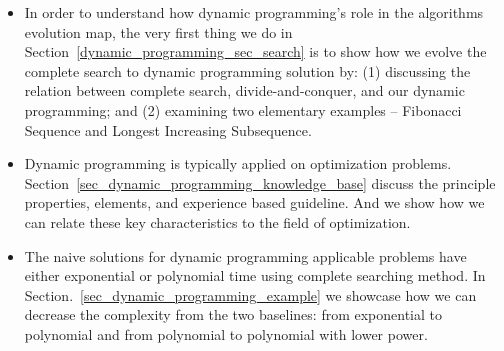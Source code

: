 \documentclass[../main.tex]{subfiles}
\begin{document}
\begin{itemize}
    \item In order to understand how dynamic programming's role in the algorithms evolution map, the very first thing we do in Section~\ref{dynamic_programming_sec_search} is to show how we evolve the complete search to dynamic programming solution by: (1) discussing the relation between complete search, divide-and-conquer, and our dynamic programming; and (2) examining two elementary examples -- Fibonacci Sequence and Longest Increasing Subsequence. 
    \item Dynamic programming is typically applied on optimization problems. Section~\ref{sec_dynamic_programming_knowledge_base} discuss the principle properties, elements, and experience based guideline. And we show how we can relate these key characteristics to the field of optimization. 
    \item The naive solutions for dynamic programming applicable problems have either exponential or polynomial time using complete searching method. In Section.~\ref{sec_dynamic_programming_example} we showcase how we can decrease the complexity from the two baselines: from exponential to polynomial and  from polynomial to polynomial with lower power. 
\end{itemize}

\end{document}
